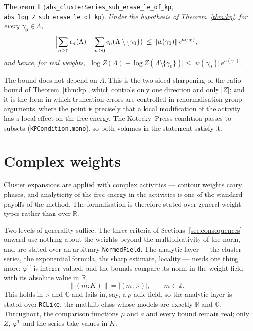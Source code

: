 \documentclass[11pt]{amsart}
\newtheorem{theorem}{Theorem}[section]
\begin{document}
\begin{theorem}[\texttt{abs\_clusterSeries\_sub\_erase\_le\_of\_kp},
\texttt{abs\_log\_Z\_sub\_erase\_le\_of\_kp}]\label{thm:local}
Under the hypothesis of Theorem~\ref{thm:kp}, for every
$\gamma_0 \in \Lambda$,
\[
  \Bigl\lvert
    \sum_{n \ge 0} c_n(\Lambda) - \sum_{n \ge 0} c_n(\Lambda \setminus \{\gamma_0\})
  \Bigr\rvert
  \le \lVert w(\gamma_0)\rVert\, e^{a(\gamma_0)},
\]
and hence, for real weights,
$\lvert \log Z(\Lambda) - \log Z(\Lambda \setminus \{\gamma_0\})\rvert
\le \lvert w(\gamma_0)\rvert\, e^{a(\gamma_0)}$.
\end{theorem}

The bound does not depend on $\Lambda$. This is the two-sided sharpening
of the ratio bound of Theorem~\ref{thm:kp}, which controls only one
direction and only $\lvert Z \rvert$; and it is the form in which
truncation errors are controlled in renormalisation group arguments,
where the point is precisely that a local modification of the activity
has a local effect on the free energy. The Kotecký--Preiss condition
passes to subsets (\texttt{KPCondition.mono}), so both volumes in the
statement satisfy it.

\section{Complex weights}\label{sec:complex}

Cluster expansions are applied with complex activities --- contour
weights carry phases, and analyticity of the free energy in the
activities is one of the standard payoffs of the method. The
formalisation is therefore stated over general weight types rather than
over $\mathbb R$.

Two levels of generality suffice. The three criteria of
Sections~\ref{sec:consequences} onward use nothing about the weights
beyond the multiplicativity of the norm, and are stated over an
arbitrary \texttt{NormedField}. The analytic layer --- the cluster
series, the exponential formula, the sharp estimate, locality --- needs
one thing more: $\varphi^{\mathrm T}$ is integer-valued, and the bounds
compare its norm in the weight field with its absolute value in
$\mathbb R$,
\[
  \lVert (m : K) \rVert = \lvert (m : \mathbb R) \rvert,
  \qquad m \in \mathbb Z .
\]
This holds in $\mathbb R$ and $\mathbb C$ and fails in, say, a $p$-adic
field, so the analytic layer is stated over \texttt{RCLike}, the
\textsf{mathlib} class whose models are exactly $\mathbb R$ and
$\mathbb C$. Throughout, the comparison functions $\mu$ and $a$ and every
bound remain real; only $Z$, $\varphi^{\mathrm T}$ and the series take
values in $K$.
\end{document}
